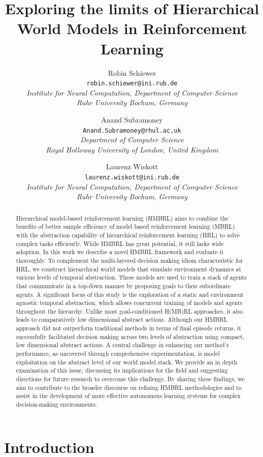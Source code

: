 \documentclass{article}
\title{Exploring the limits of Hierarchical World Models in Reinforcement Learning}
\author{
Robin Schiewer \\ \texttt{robin.schiewer@ini.rub.de} \\ \textit{Institute for Neural Computation, Department of Computer Science} \\ \textit{Ruhr University Bochum, Germany}
\and
Anand Subramoney \\ \texttt{Anand.Subramoney@rhul.ac.uk} \\ \textit{ Department of Computer Science} \\ \textit{Royal Holloway University of London, United Kingdom}
\and
Laurenz Wiskott \\ \texttt{laurenz.wiskott@ini.rub.de} \\ \textit{Institute for Neural Computation, Department of Computer Science} \\ \textit{Ruhr University Bochum, Germany}
}
\date{}
\begin{document}
\maketitle

\begin{abstract}
Hierarchical model-based reinforcement learning (HMBRL) aims to combine the benefits of better sample efficiency of model based reinforcement learning (MBRL) with the abstraction capability of hierarchical reinforcement learning (HRL) to solve complex tasks efficiently.
While HMBRL has great potential, it still lacks wide adoption.
In this work we describe a novel HMBRL framework and evaluate it thoroughly. 
To complement the multi-layered decision making idiom characteristic for HRL, we construct hierarchical world models that simulate environment dynamics at various levels of temporal abstraction. 
These models are used to train a stack of agents that communicate in a top-down manner by proposing goals to their subordinate agents. 
A significant focus of this study is the exploration of a static and environment agnostic temporal abstraction, which allows concurrent training of models and agents throughout the hierarchy. 
Unlike most goal-conditioned H(MB)RL approaches, it also leads to comparatively low dimensional abstract actions.
Although our HMBRL approach did not outperform traditional methods in terms of final episode returns, it successfully facilitated decision making across two levels of abstraction using compact, low dimensional abstract actions. 
A central challenge in enhancing our method's performance, as uncovered through comprehensive experimentation, is model exploitation on the abstract level of our world model stack. 
We provide an in depth examination of this issue, discussing its implications for the field and suggesting directions for future research to overcome this challenge. 
By sharing these findings, we aim to contribute to the broader discourse on refining HMBRL methodologies and to assist in the development of more effective autonomous learning systems for complex decision-making environments.
\end{abstract}

\section{Introduction}
\end{document}
